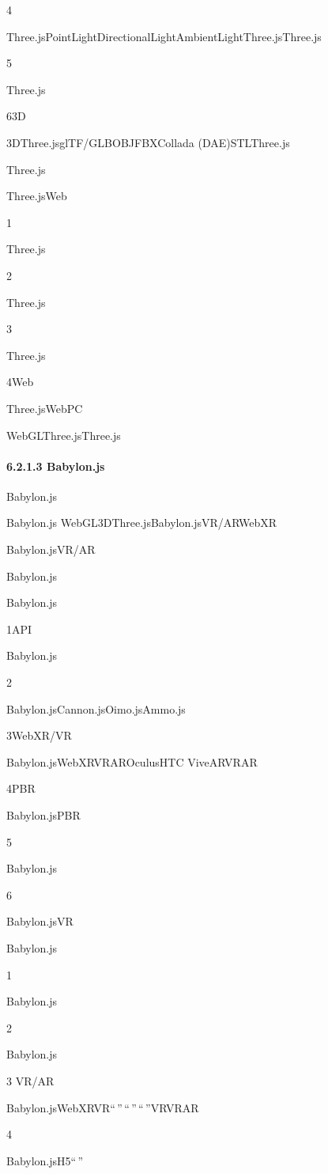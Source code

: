 4

Three.jsPointLightDirectionalLightAmbientLightThree.jsThree.js

5

Three.js

63D

3DThree.jsglTF/GLBOBJFBXCollada (DAE)STLThree.js

Three.js

Three.jsWeb

1

Three.js

2

Three.js

3

Three.js

4Web

Three.jsWebPC

WebGLThree.jsThree.js

\hypertarget{babylon.js}{%
\paragraph{6.2.1.3 Babylon.js}\label{babylon.js}}

Babylon.js

Babylon.js WebGL3DThree.jsBabylon.jsVR/ARWebXR

Babylon.jsVR/AR

Babylon.js

Babylon.js

1API

Babylon.js

2

Babylon.jsCannon.jsOimo.jsAmmo.js

3WebXR/VR

Babylon.jsWebXRVRAROculusHTC ViveARVRAR

4PBR

Babylon.jsPBR

5

Babylon.js

6

Babylon.jsVR

Babylon.js

1

Babylon.js

2

Babylon.js

3 VR/AR

Babylon.jsWebXRVR``\,''\,``\,''\,``\,''VRVRAR

4

Babylon.jsH5``\,''

